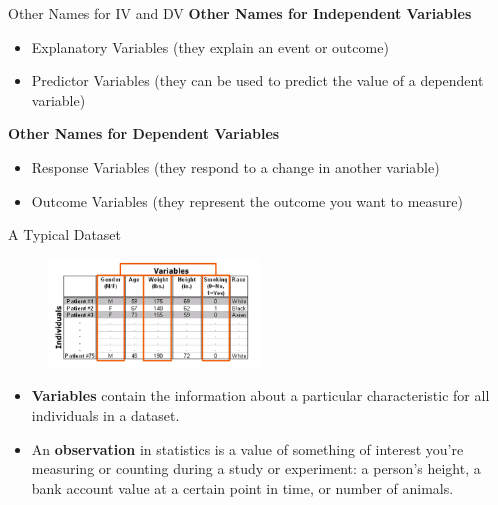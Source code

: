 \documentclass[10pt,dvipsnames, aspectratio=169]{beamer}
\begin{document}
\begin{frame}[t]{Other Names for IV and DV}
	\textbf{Other Names for Independent Variables}
	\begin{itemize}
		\item Explanatory Variables (they explain an event or outcome)
		\item Predictor Variables (they can be used to predict the value of a 
		dependent variable)
	\end{itemize} 
	\textbf{Other Names for Dependent Variables}
	\begin{itemize}
		\item Response Variables (they respond to a change in another variable)
		\item Outcome Variables (they represent the outcome you want to measure)
	\end{itemize}
\end{frame}


\begin{frame}[t]{A Typical Dataset}
	\begin{figure} [ht]
		\centering
		\includegraphics[width=0.5\textwidth]{stats_img/dataset.png}
	\end{figure}
	
	\begin{itemize}
		\item \textbf{Variables} contain the information about a particular 
		characteristic 
		for all individuals in a dataset.
		\item An \textbf{observation} in statistics is a value of something of 
		interest you're measuring or counting during a study or experiment: a 
		person's height, a bank account value at a certain point in time, or 
		number 
		of animals.
	\end{itemize}
	
\end{frame}
\end{document}
